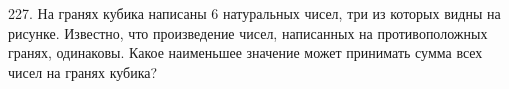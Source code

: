 227. На гранях кубика написаны 6 натуральных чисел, три из которых видны на рисунке. Известно, что произведение чисел, написанных на противоположных гранях, одинаковы. Какое наименьшее значение может принимать сумма всех чисел на гранях кубика?
\begin{center}
\begin{figure}[ht!]
\end{figure}
\end{center}

